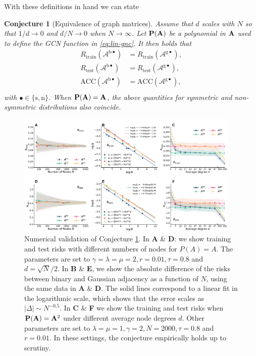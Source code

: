 \documentclass[9pt,twocolumn]{pnas-new}
\newtheorem{conjecture}{Conjecture}
\begin{document}
With these definitions in hand we can state
\begin{conjecture}[Equivalence of graph matrices] \label{conj: Equivalence}
Assume that $d$ scales with $N$ so that $1/d \to 0$ and $d/N\to 0$ when  $N\to\infty$. Let $\mathbf{P}(\mathbf{A})$ be a polynomial in $\mathbf{A}$ used to define the GCN function in \eqref{eq:lin-gnc}. It then holds that
$$
\begin{aligned}
    R_\mathrm{train}(\mathcal{A}^{\mathrm{b \bullet}})
    &= R_\mathrm{train}(\mathcal{A}^{\mathrm{g \bullet}}), \\
    R_\mathrm{test}(\mathcal{A}^{\mathrm{b \bullet}})
    &= R_\mathrm{test}(\mathcal{A}^{\mathrm{g \bullet}}), \\
    \mathrm{ACC}(\mathcal{A}^{\mathrm{b \bullet}}) 
    &= \mathrm{ACC}(\mathcal{A}^{\mathrm{g \bullet}}), \\
\end{aligned}
$$
with $\bullet \in \{ \mathrm{s}, \mathrm{n} \}$. When $\mathbf{P}(\mathbf{A}) = \mathbf{A}$, the above quantities for symmetric and non-symmetric distributions also coincide.
\end{conjecture}




\begin{figure}[ht!]
    \includegraphics[width=0.95\textwidth]{figs_conjecture.pdf}
    \caption{Numerical validation of Conjecture \ref{conj: Equivalence}. In \textbf{\textsf{A}} \& \textbf{\textsf{D}}: we show training and test risks with different numbers of nodes for $P(A)=A$. The parameters are set to $\gamma=\lambda=\mu=2,r=0.01,\tau=0.8$ and $d=\sqrt{N}/2$. In \textbf{\textsf{B}} \& \textbf{\textsf{E}}, we show the absolute difference of the risks between binary and Gaussian adjacency as a function of $N$, using the same data in \textbf{\textsf{A}} \& \textbf{\textsf{D}}. The solid lines correspond to a linear fit in the logarithmic scale, which shows that the error scales as $\vert\Delta \vert \sim N^{-0.5}$. In \textbf{\textsf{C}} \& \textbf{\textsf{F}} we show the training and test risks when  $\mathbf{P}(\mathbf{A})=\mathbf{A}^2$ under different average node degrees $d$. Other parameters are set to $\lambda=\mu=1,\gamma=2,N=2000, \tau=0.8$ and $r=0.01$. In these settings, the conjecture empirically holds up to scrutiny.} 
    \label{fig: conjecture}
\end{figure}
\end{document}
